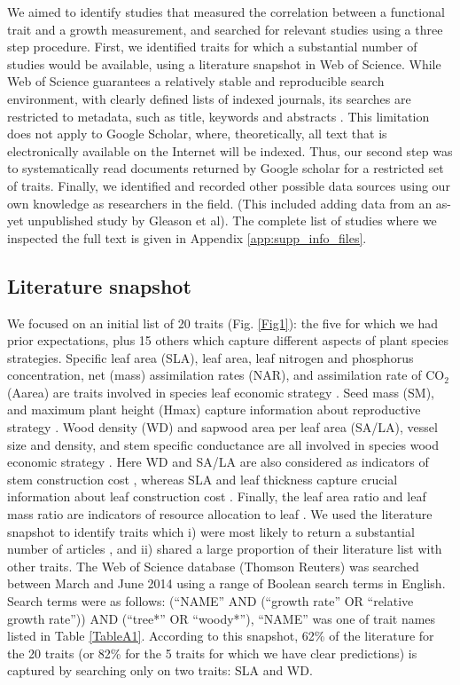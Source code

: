 \documentclass[a4paper]{article}\usepackage[]{graphicx}\usepackage[]{color}
\begin{document}
We aimed to identify studies that measured the correlation between a functional trait and a growth measurement, and searched for relevant studies using a three step procedure. First, we identified traits for which a substantial number of studies would be available, using a literature snapshot in Web of Science. While Web of Science guarantees a relatively stable and reproducible search environment, with clearly defined lists of indexed journals, its searches are restricted to metadata, such as title, keywords and abstracts \citep{Beckmann:2012hn}. This limitation does not apply to Google Scholar, where, theoretically, all text that is electronically available on the Internet will be indexed. Thus, our second step was to systematically read documents returned by Google scholar for a restricted set of traits. Finally, we identified and recorded other possible data sources using our own knowledge as researchers in the field. (This included adding data from an as-yet unpublished study by Gleason et al). The complete list of studies where we inspected the full text is given in Appendix \ref{app:supp_info_files}.

\subsection*{Literature snapshot}\label{literature-snapshot}

We focused on an initial list of 20 traits (Fig. \ref{Fig1}): the five for which we had prior expectations, plus 15 others which capture different aspects of plant species strategies. Specific leaf area (SLA), leaf area, leaf nitrogen and phosphorus concentration, net (mass) assimilation rates (NAR), and assimilation rate of CO$_2$ (Aarea) are traits involved in species leaf economic strategy \citep{Wright:2004jb,Wright:2010tp}. Seed mass (SM), and maximum plant height (Hmax) capture information about reproductive strategy \citep{Falster:2005bw,Moles:2006ft}. Wood density (WD) and sapwood area per leaf area (SA/LA), vessel size and density, and stem specific conductance are all involved in species wood economic strategy \citep{Chave:2009iy}. Here WD and SA/LA are also considered as indicators of stem construction cost \citep{Falster:2011ii}, whereas SLA and leaf thickness capture crucial information about leaf construction cost \citep{Wright:2004jb}. Finally, the leaf area ratio and leaf mass ratio are indicators of resource allocation to leaf \citep{Lambers:1992bj}. We used the literature snapshot to identify traits which i) were most likely to return a substantial number of articles , and ii) shared a large proportion of their literature list with other traits. The Web of Science database (Thomson Reuters) was searched between March and June 2014 using a range of Boolean search terms in English. Search terms were as follows: (``NAME'' AND (``growth rate'' OR ``relative growth rate'')) AND (``tree*'' OR ``woody*''), ``NAME'' was one of trait names listed in Table \ref{TableA1}. According to this snapshot, 62\% of the literature for the 20 traits (or 82\% for the 5 traits for which we have clear predictions) is captured by searching only on two traits: SLA and WD.
\end{document}
